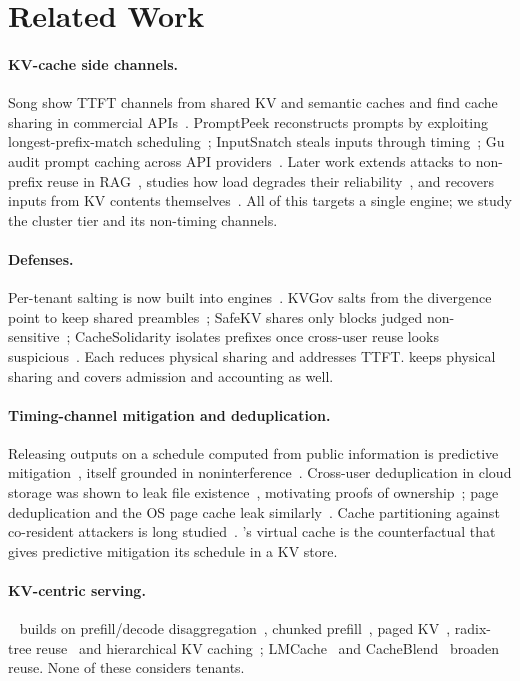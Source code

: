 \section{Related Work}
\label{sec:related}

\paragraph{KV-cache side channels.} Song \etal show TTFT channels from shared KV
and semantic caches and find cache sharing in commercial
APIs~\cite{song2024earlybird}. PromptPeek reconstructs prompts by exploiting
longest-prefix-match scheduling~\cite{wu2025promptpeek}; InputSnatch steals
inputs through timing~\cite{zheng2024inputsnatch}; Gu \etal audit prompt caching
across API providers~\cite{gu2025auditing}. Later work extends attacks to
non-prefix reuse in RAG~\cite{spliceleak2026}, studies how load degrades their
reliability~\cite{abubakar2026contention}, and recovers inputs from KV contents
themselves~\cite{luo2026shadow}. All of this targets a single engine; we study
the cluster tier and its non-timing channels.

\paragraph{Defenses.} Per-tenant salting is now built into
engines~\cite{vllmcachesalt,dynamonvext}. KVGov salts from the divergence point
to keep shared preambles~\cite{addagada2026kvgov}; SafeKV shares only blocks
judged non-sensitive~\cite{chu2025safekv}; CacheSolidarity isolates prefixes
once cross-user reuse looks suspicious~\cite{pennas2026cachesolidarity}. Each
reduces physical sharing and addresses TTFT. \sys keeps physical sharing and
covers admission and accounting as well.

\paragraph{Timing-channel mitigation and deduplication.} Releasing outputs on a
schedule computed from public information is predictive
mitigation~\cite{askarov2010predictive,zhang2011predictive}, itself grounded in
noninterference~\cite{goguen1982security}. Cross-user deduplication in cloud
storage was shown to leak file existence~\cite{harnik2010dedup}, motivating
proofs of ownership~\cite{halevi2011pow}; page deduplication and the OS page
cache leak similarly~\cite{gruss2019pagecache}. Cache partitioning against
co-resident attackers is long studied~\cite{ristenpart2009cloud,yarom2014flush}.
\sys's virtual cache is the counterfactual that gives predictive mitigation its
schedule in a KV store.

\paragraph{KV-centric serving.} \mc~\cite{qin2025mooncake} builds on prefill/decode
disaggregation~\cite{zhong2024distserve,patel2024splitwise}, chunked
prefill~\cite{agrawal2024sarathi}, paged KV~\cite{kwon2023vllm}, radix-tree
reuse~\cite{zheng2024sglang} and hierarchical KV
caching~\cite{gao2024cachedattention}; LMCache~\cite{liu2025lmcache} and
CacheBlend~\cite{yao2025cacheblend} broaden reuse. None of these considers
tenants.
